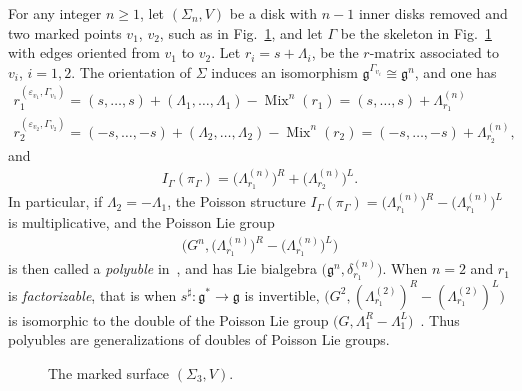 \documentclass[pdftex]{sigma}
\numberwithin{equation}{section}
\def \g {\mathfrak{a}}
\def \g {\mathfrak{g}}
\DeclareMathOperator{\Mix}{Mix}
\def \sGam {{\scriptscriptstyle \Gamma}}
\newcommand{\ra}{\rangle}
\begin{document}
\begin{Example}
For any integer $n \geq 1$, let $(\Sigma_n, V)$ be a disk with $n-1$ inner disks removed and two marked points $v_1$, $v_2$, such as in Fig.~\ref{sigma_3:fig}, and let $\Gamma$ be the skeleton in Fig.~\ref{sigma_3:fig} with edges oriented from $v_1$ to $v_2$. Let $r_i = s + \Lambda_i$, be the $r$-matrix associated to $v_i$, $i=1,2$. The orientation of $\Sigma$ induces an isomorphism $\g^{\sGam_{v_i}} \cong \g^n$, and one has
\begin{gather*}
r_1^{(\varepsilon_{v_1}, \sGam_{v_1})} = (s, \ldots, s) + (\Lambda_1, \ldots, \Lambda_1) - \Mix^n(r_1) = (s, \ldots, s) + \Lambda_{r_1}^{(n)} \\
r_2^{(\varepsilon_{v_2}, \sGam_{v_2})} = (-s, \ldots, -s) + (\Lambda_2, \ldots, \Lambda_2) - \Mix^n(r_2) = (-s, \ldots, -s) + \Lambda_{r_2}^{(n)},
\end{gather*}
and
\begin{gather*}
I_{\Gamma}(\pi_{\sGam}) = \big(\Lambda_{r_1}^{(n)}\big)^R + \big(\Lambda_{r_2}^{(n)}\big)^L.
\end{gather*}
In particular, if $\Lambda_2 = -\Lambda_1$, the Poisson structure $I_{\Gamma}(\pi_{\sGam}) = \big(\Lambda_{r_1}^{(n)}\big)^R - \big(\Lambda_{r_1}^{(n)}\big)^L$ is multiplicative, and the Poisson Lie group
\begin{gather*}
\big(G^n, \big(\Lambda_{r_1}^{(n)}\big)^R - \big(\Lambda_{r_1}^{(n)}\big)^L\big)
\end{gather*}
is then called a {\it polyuble} in~\cite{FR2}, and has Lie bialgebra $\big(\g^n, \delta_{r_1}^{(n)}\big)$. When $n = 2$ and $r_1$ is {\it factorizable}, that is when $s^\sharp\colon \g^* \to \g$ is invertible, $\big(G^2, (\Lambda_{r_1}^{(2)})^R - (\Lambda_{r_1}^{(2)})^L\big)$ is isomorphic to the double of the Poisson Lie group $\big(G, \Lambda_1^R - \Lambda_1^L\big)$~\cite{Lu-Mou:mixed}. Thus polyubles are generalizations of doubles of Poisson Lie groups.

\begin{figure}\centering
{}
\caption{The marked surface $(\Sigma_3, V)$.} \label{sigma_3:fig}
\end{figure}
\end{Example}
\end{document}
